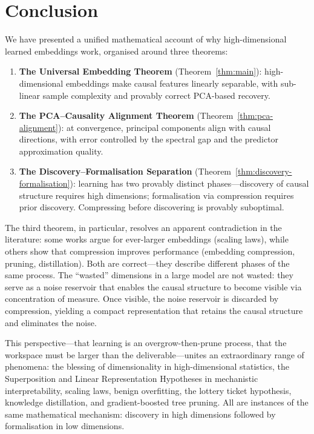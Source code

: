 \documentclass[11pt,a4paper]{article}
\theoremstyle{plain}
\theoremstyle{definition}
\theoremstyle{remark}
\begin{document}
\section{Conclusion}\label{sec:conclusion}

We have presented a unified mathematical account of why high-dimensional learned
embeddings work, organised around three theorems:

\begin{enumerate}[leftmargin=2em]
  \item \textbf{The Universal Embedding Theorem} (Theorem~\ref{thm:main}):
    high-dimensional embeddings make causal features linearly separable, with
    sub-linear sample complexity and provably correct PCA-based recovery.

  \item \textbf{The PCA--Causality Alignment Theorem}
    (Theorem~\ref{thm:pca-alignment}): at convergence, principal components
    align with causal directions, with error controlled by the spectral gap and
    the predictor approximation quality.

  \item \textbf{The Discovery--Formalisation Separation}
    (Theorem~\ref{thm:discovery-formalisation}): learning has two provably
    distinct phases---discovery of causal structure requires high dimensions;
    formalisation via compression requires prior discovery.  Compressing before
    discovering is provably suboptimal.
\end{enumerate}

The third theorem, in particular, resolves an apparent contradiction in the
literature: some works argue for ever-larger embeddings (scaling laws), while
others show that compression improves performance (embedding compression,
pruning, distillation).  Both are correct---they describe different phases of
the same process.  The ``wasted'' dimensions in a large model are not wasted:
they serve as a noise reservoir that enables the causal structure to become
visible via concentration of measure.  Once visible, the noise reservoir is
discarded by compression, yielding a compact representation that retains the
causal structure and eliminates the noise.

This perspective---that learning is an overgrow-then-prune process, that the
workspace must be larger than the deliverable---unites an extraordinary range of
phenomena: the blessing of dimensionality in high-dimensional statistics, the
Superposition and Linear Representation Hypotheses in mechanistic
interpretability, scaling laws, benign overfitting, the lottery ticket
hypothesis, knowledge distillation, and gradient-boosted tree pruning.  All are
instances of the same mathematical mechanism: discovery in high dimensions
followed by formalisation in low dimensions.
\end{document}
